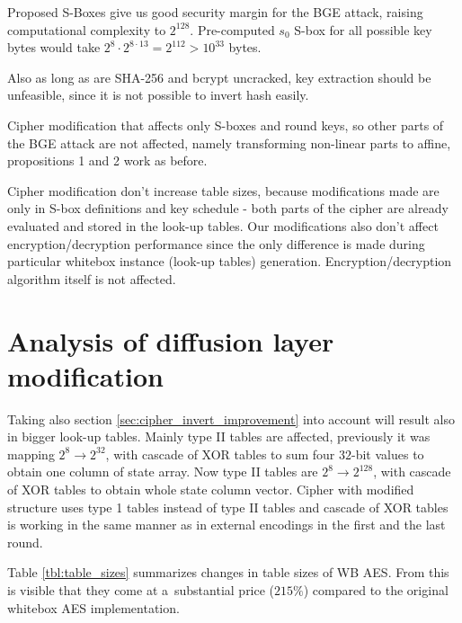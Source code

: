 \documentclass[11pt,oneside,final]{fithesis2}
\begin{document}
    Proposed S-Boxes give us good security margin for the BGE attack, raising computational complexity to $2^{128}$. 
    Pre-computed $s_0$ S-box for all possible key bytes would take $2^8 \cdot 2^{8\cdot13} = 2^{112} > 10^{33}$ bytes. 

    Also as long as are SHA-256 and bcrypt uncracked, key extraction should be unfeasible, since it is not possible to invert hash easily. 

    Cipher modification that affects only S-boxes and round keys, so other parts of the BGE attack are not affected, namely transforming non-linear parts
    to affine, propositions 1 and 2 work as before. 

    Cipher modification don't increase table sizes, because modifications made are only in S-box definitions and key schedule - both 
    parts of the cipher are already evaluated and stored in the look-up tables. Our modifications also don't affect encryption/decryption performance since the only
    difference is made during particular whitebox instance (look-up tables) generation. Encryption/decryption algorithm itself is not affected.
    
    \section{Analysis of diffusion layer modification}
    Taking also section \ref{sec:cipher_invert_improvement} into account will result also in bigger look-up tables. Mainly type II tables are affected, previously 
    it was mapping $2^8 \rightarrow 2^{32}$, with cascade of XOR tables to sum four $32$-bit values to obtain one column of state array. Now type II tables are
    $2^8 \rightarrow 2^{128}$, with cascade of XOR tables to obtain whole state column vector. Cipher with modified structure uses type 1 tables instead of type II tables
    and cascade of XOR tables is working in the same manner as in external encodings in the first and the last round.

    Table \ref{tbl:table_sizes} summarizes changes in table sizes of WB AES. From this is visible that
    they come at a~substantial price ($215\%$) compared to the original whitebox AES implementation.
    
\end{document}
